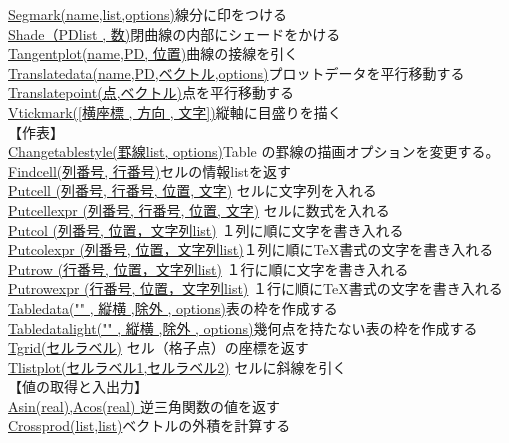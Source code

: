 \documentclass[papersize,a4paper,12pt,uplatex]{jsarticle}
\begin{document}
\begin{tabbing}
\hyperlink{drawsegmark}{Segmark(name,list,options)}\>線分に印をつける\\
\hyperlink{shade}{Shade（PDlist , 数)}\>閉曲線の内部にシェードをかける\\
\hyperlink{tangentplot}{Tangentplot(name,PD, 位置)}\>曲線の接線を引く\\
\hyperlink{translatedata}{Translatedata(name,PD,ベクトル,options)}\>プロットデータを平行移動する\\
\hyperlink{translatepoint}{Translatepoint(点,ベクトル)}\>点を平行移動する\\
\hyperlink{vtickmark}{Vtickmark([横座標 , 方向 , 文字])}\>縦軸に目盛りを描く\\
【作表】\\
\hyperlink{changetablestyle}{Changetablestyle(罫線list, options)}\>Table の罫線の描画オプションを変更する。\\
\hyperlink{findcell}{Findcell(列番号, 行番号)}\>セルの情報listを返す\\
\hyperlink{putcell}{Putcell (列番号, 行番号, 位置, 文字)} \>セルに文字列を入れる\\
\hyperlink{putcell}{Putcellexpr (列番号, 行番号, 位置, 文字)} \>セルに数式を入れる\\\hyperlink{putcol}{Putcol (列番号, 位置，文字列list)} \>１列に順に文字を書き入れる\\
\hyperlink{putcolexpr}{Putcolexpr (列番号, 位置，文字列list)}\>１列に順に\TeX 書式の文字を書き入れる\\
\hyperlink{putrow}{Putrow (行番号, 位置，文字列list)} \>１行に順に文字を書き入れる\\
\hyperlink{putrowexpr}{Putrowexpr (行番号, 位置，文字列list)} \>１行に順に\TeX 書式の文字を書き入れる\\
\hyperlink{tabledata}{Tabledata("" , 縦横 ,除外 , options)}\>表の枠を作成する\\
\hyperlink{tabledatalight}{Tabledatalight("" , 縦横 ,除外 , options)}\>幾何点を持たない表の枠を作成する\\
\hyperlink{tgrid}{Tgrid(セルラベル)} \>セル（格子点）の座標を返す\\
\hyperlink{tlistplot}{Tlistplot(セルラベル1,セルラベル2)} \>セルに斜線を引く\\
\vspace{\baselineskip}
【値の取得と入出力】\\
\hyperlink{asin}{Asin(real),Acos(real) }\>逆三角関数の値を返す\\
\hyperlink{crossprod}{Crossprod(list,list)}\>ベクトルの外積を計算する\\

\end{tabbing}
\end{document}
